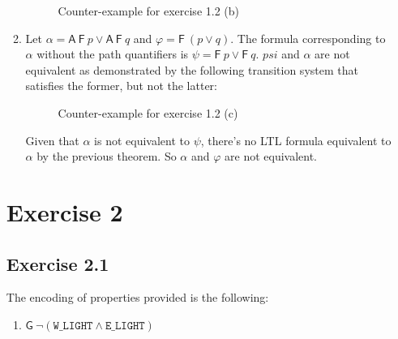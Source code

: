 \documentclass[12pt]{article}
\newcommand{\drafter}[1]{#1}
\begin{document}
\begin{enumerate}[label=\roman*.]
\begin{enumerate}[label=(\alph*)]
\begin{figure}[ht]
      \caption{Counter-example for exercise 1.2 (b)}
      \label{fig:1-2-b}
    \end{figure}

  \item Let $\alpha = \mathsf{A}~\mathsf{F}~p \vee \mathsf{A}~\mathsf{F}~q$ and $\varphi = \mathsf{F}~(p \vee q)$.
    The formula corresponding to $\alpha$ without the path quantifiers is $\psi = \mathsf{F}~p \vee \mathsf{F}~q$.
    $psi$ and $\alpha$ are not equivalent as demonstrated by the following transition system that satisfies the former, but not the latter:

    \begin{figure}[ht]
      \centering
      \caption{Counter-example for exercise 1.2 (c)}
      \label{fig:1-2-c}
    \end{figure}

  Given that $\alpha$ is not equivalent to $\psi$, there's no LTL formula equivalent to $\alpha$ by the previous theorem.
  So $\alpha$ and $\varphi$ are not equivalent.

\end{enumerate}

\section*{Exercise 2}

\subsection*{Exercise 2.1}

\drafter{The encoding of properties provided is the following:}

\begin{enumerate}[label=(\alph*)]
  \item $\mathsf{G}~\neg(\texttt{W\_LIGHT} \wedge \texttt{E\_LIGHT})$


\end{enumerate}
\end{enumerate}
\end{document}
